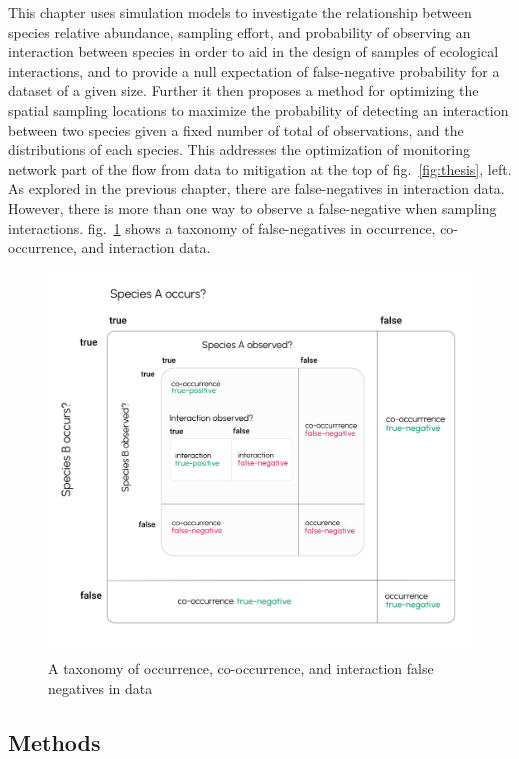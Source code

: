 \documentclass[10pt,oneside]{article}
\makeatletter
\def\maxwidth{\ifdim\Gin@nat@width>\linewidth\linewidth
\else\Gin@nat@width\fi}
\let\Oldincludegraphics\includegraphics
\renewcommand{\includegraphics}[1]{\Oldincludegraphics[width=\maxwidth]{#1}}
\makeatother
\begin{document}
This chapter uses simulation models to investigate the relationship
between species relative abundance, sampling effort, and probability of
observing an interaction between species in order to aid in the design
of samples of ecological interactions, and to provide a null expectation
of false-negative probability for a dataset of a given size. Further it
then proposes a method for optimizing the spatial sampling locations to
maximize the probability of detecting an interaction between two species
given a fixed number of total of observations, and the distributions of
each species. This addresses the optimization of monitoring network part
of the flow from data to mitigation at the top of fig.~\ref{fig:thesis},
left. As explored in the previous chapter, there are false-negatives in
interaction data. However, there is more than one way to observe a
false-negative when sampling interactions. fig.~\ref{fig:fnrtaxonomy}
shows a taxonomy of false-negatives in occurrence, co-occurrence, and
interaction data.

\begin{figure}
\hypertarget{fig:fnrtaxonomy}{%
\centering
\includegraphics{./figures/ch2.png}
\caption{A taxonomy of occurrence, co-occurrence, and interaction false
negatives in data}\label{fig:fnrtaxonomy}
}
\end{figure}

\hypertarget{methods}{%
\subsection{Methods}\label{methods}}
\end{document}
